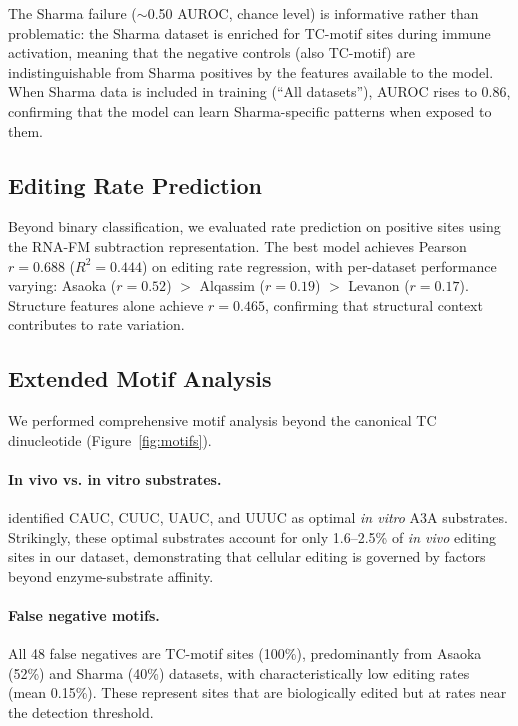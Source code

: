 \documentclass[11pt]{article}
\begin{document}
The Sharma failure ($\sim$0.50 AUROC, chance level) is informative rather than
problematic: the Sharma dataset is enriched for TC-motif sites during immune
activation, meaning that the negative controls (also TC-motif) are
indistinguishable from Sharma positives by the features available to the model.
When Sharma data is included in training (``All datasets''), AUROC rises to 0.86,
confirming that the model can learn Sharma-specific patterns when exposed to them.

\subsection{Editing Rate Prediction}

Beyond binary classification, we evaluated rate prediction on positive sites
using the RNA-FM subtraction representation. The best model achieves Pearson
$r = 0.688$ ($R^2 = 0.444$) on editing rate regression, with per-dataset
performance varying: Asaoka ($r = 0.52$) $>$ Alqassim ($r = 0.19$) $>$
Levanon ($r = 0.17$). Structure features alone achieve $r = 0.465$,
confirming that structural context contributes to rate variation.

\subsection{Extended Motif Analysis}

We performed comprehensive motif analysis beyond the canonical TC dinucleotide
(Figure~\ref{fig:motifs}).

\paragraph{In vivo vs. in vitro substrates.}
\citet{jalili2023} identified CAUC, CUUC, UAUC, and UUUC as optimal
\emph{in vitro} A3A substrates. Strikingly, these optimal substrates account
for only 1.6--2.5\% of \emph{in vivo} editing sites in our dataset, demonstrating
that cellular editing is governed by factors beyond enzyme-substrate affinity.

\paragraph{False negative motifs.}
All 48 false negatives are TC-motif sites (100\%), predominantly from Asaoka
(52\%) and Sharma (40\%) datasets, with characteristically low editing rates
(mean 0.15\%). These represent sites that are biologically edited but at rates
near the detection threshold.
\end{document}
